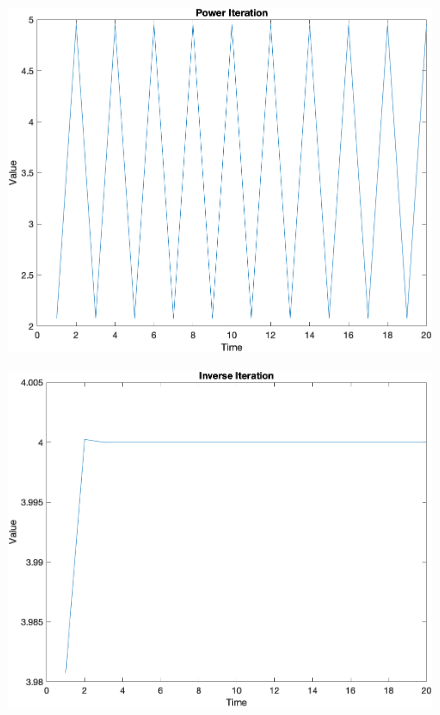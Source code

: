 \documentclass[english,onecolumn]{IEEEtran}
\begin{document}
\begin{figure}[htbp]
	\centering
	\includegraphics[width=0.4\linewidth]{p5_1.png}
\end{figure}
\begin{figure}[htbp]
	\centering
	\includegraphics[width=0.4\linewidth]{p5_2.png}
\end{figure}

\newpage 
\end{document}
